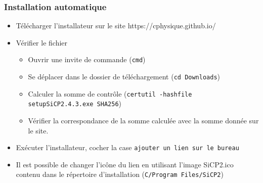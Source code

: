 \subsubsection{Installation automatique}
%
\begin{itemize}[leftmargin=1cm, label=, itemsep=0pt]
%
\item Télécharger l'installateur sur le site https://cphysique.github.io/
\item Vérifier le fichier
	\begin{itemize}[leftmargin=1cm, label=, itemsep=0pt]
	\item Ouvrir une invite de commande (\texttt{cmd})
	\item Se déplacer dans le dossier de téléchargement (\texttt{cd Downloads})
	\item Calculer la somme de contrôle (\texttt{certutil -hashfile setupSiCP2.4.3.exe SHA256})
	\item Vérifier la correspondance de la somme calculée avec la somme donnée sur le site.
	\end{itemize}
\item Exécuter l'installateur, cocher la case \texttt{ajouter un lien sur le bureau}
\item Il est possible de changer l'icône du lien en utilisant l'image SiCP2.ico contenu dans le répertoire d'installation (\texttt{C/Program Files/SiCP2})
%
\end{itemize}
%
%
%
